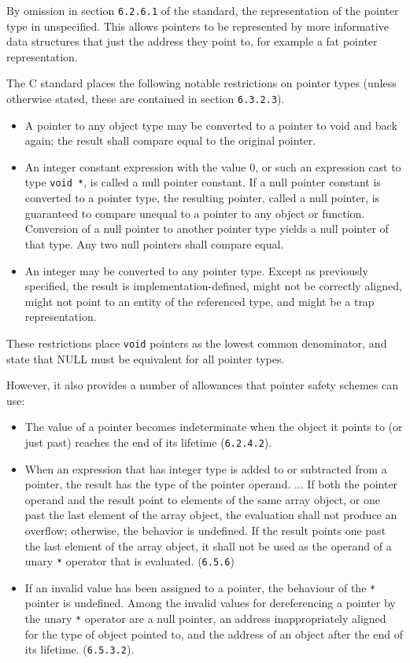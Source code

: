 By omission in section \verb!6.2.6.1! of the standard, the representation of the pointer type in unspecified.
This allows pointers to be represented by more informative data structures that just the address they point to, for example a fat pointer representation.

The C standard places the following notable restrictions on pointer types (unless otherwise stated, these are contained in section \verb!6.3.2.3!).

\begin{itemize}
\item A pointer to any object type may be converted to a pointer to void and back again; the result shall compare equal to the original pointer.
\item An integer constant expression with the value 0, or such an expression cast to type \verb!void *!, is called a null pointer constant.  
If a null pointer constant is converted to a pointer type, the resulting pointer, called a null pointer, is guaranteed to compare unequal to a pointer to any object or function.
Conversion of a null pointer to another pointer type yields a null pointer of that type.  
Any two null pointers shall compare equal.
\item An integer may be converted to any pointer type.
Except as previously specified, the result is implementation-defined, might not be correctly aligned, might not point to an entity of the referenced type, and might be a trap representation.
\end{itemize}

These restrictions place \verb!void! pointers as the lowest common denominator, and state that NULL must be equivalent for all pointer types.

However, it also provides a number of allowances that pointer safety schemes can use:

\begin{itemize}
\item The value of a pointer becomes indeterminate when the object it points to (or just past) reaches the end of its lifetime (\verb!6.2.4.2!).
\item When an expression that has integer type is added to or subtracted from a pointer, the result has the type of the pointer operand.
...
If both the pointer operand and the result point to elements of the same array object, or one past the last element of the array object, the evaluation shall not produce an overflow; otherwise, the behavior is undefined.
If the result points one past the last element of the array object, it shall not be used as the operand of a unary \verb!*! operator that is evaluated. (\verb!6.5.6!)
\item If an invalid value has been assigned to a pointer, the behaviour of the \verb!*! pointer is undefined.
Among the invalid values for dereferencing a pointer by the unary \verb!*! operator are a null pointer, an address inappropriately aligned for the type of object pointed to, and the address of an object after the end of its lifetime. (\verb!6.5.3.2!).
\end{itemize}

